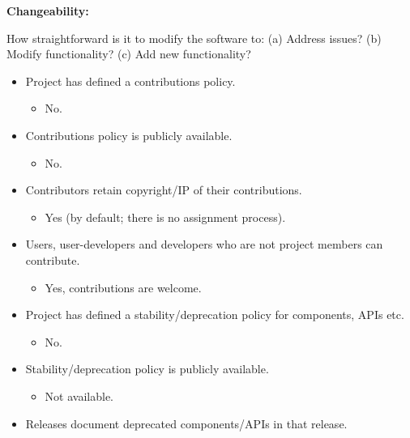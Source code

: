\textbf{Changeability:}

How straightforward is it to modify the software to: (a) Address issues?
(b) Modify functionality? (c) Add new functionality?

\begin{itemize}
\itemsep1pt\parskip0pt
\item
  Project has defined a contributions policy.

  \begin{itemize}
  \itemsep1pt\parskip0pt
  \item
    No.
  \end{itemize}
\item
  Contributions policy is publicly available.

  \begin{itemize}
  \itemsep1pt\parskip0pt
  \item
    No.
  \end{itemize}
\item
  Contributors retain copyright/IP of their contributions.

  \begin{itemize}
  \itemsep1pt\parskip0pt
  \item
    Yes (by default; there is no assignment process).
  \end{itemize}
\item
  Users, user-developers and developers who are not project members can
  contribute.

  \begin{itemize}
  \itemsep1pt\parskip0pt
  \item
    Yes, contributions are welcome.
  \end{itemize}
\item
  Project has defined a stability/deprecation policy for components,
  APIs etc.

  \begin{itemize}
  \itemsep1pt\parskip0pt
  \item
    No.
  \end{itemize}
\item
  Stability/deprecation policy is publicly available.

  \begin{itemize}
  \itemsep1pt\parskip0pt
  \item
    Not available.
  \end{itemize}
\item
  Releases document deprecated components/APIs in that release.


\end{itemize}
